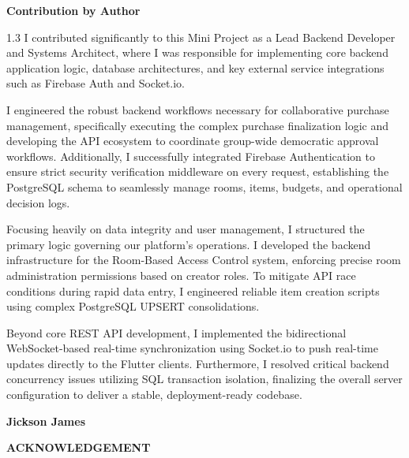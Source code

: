 \documentclass[a4paper,12pt]{article}
\begin{document}
\newpage
\thispagestyle{empty}
\begin{center}
{\Large \textbf{Contribution by Author}}\\[1cm]
\end{center}
\begin{spacing}{1.3}
I contributed significantly to this Mini Project as a Lead Backend Developer and Systems Architect, where I was responsible for implementing core backend application logic, database architectures, and key external service integrations such as Firebase Auth and Socket.io.

I engineered the robust backend workflows necessary for collaborative purchase management, specifically executing the complex purchase finalization logic and developing the API ecosystem to coordinate group-wide democratic approval workflows. Additionally, I successfully integrated Firebase Authentication to ensure strict security verification middleware on every request, establishing the PostgreSQL schema to seamlessly manage rooms, items, budgets, and operational decision logs.

Focusing heavily on data integrity and user management, I structured the primary logic governing our platform's operations. I developed the backend infrastructure for the Room-Based Access Control system, enforcing precise room administration permissions based on creator roles. To mitigate API race conditions during rapid data entry, I engineered reliable item creation scripts using complex PostgreSQL UPSERT consolidations.

Beyond core REST API development, I implemented the bidirectional WebSocket-based real-time synchronization using Socket.io to push real-time updates directly to the Flutter clients. Furthermore, I resolved critical backend concurrency issues utilizing SQL transaction isolation, finalizing the overall server configuration to deliver a stable, deployment-ready codebase.

\begin{flushright}
\textbf{Jickson James}
\end{flushright}
\end{spacing}

\newpage
\thispagestyle{empty}
\begin{center}
{\LARGE \textbf{ACKNOWLEDGEMENT}}\\[1cm]
\end{center}
\end{document}
